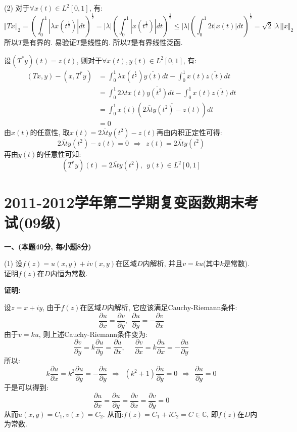 \documentclass{article}
\begin{document}
(2) 对于$\forall x(t) \in L^2[0,1]$, 有:
$$ \Vert Tx \Vert_2 = \left(\int_0^1 |\lambda x(t^{\frac{1}{2}})| dt \right)^{\frac{1}{2}} = |\lambda| \left( \int_0^1 |x(t^{\frac{1}{2}})| dt\right)^{\frac{1}{2}} \leq |\lambda| \left( \int_0^1 2t |x(t)| dt\right)^{\frac{1}{2}} = \sqrt{2} |\lambda| \Vert x \Vert_2 $$
所以$T$是有界的. 易验证$T$是线性的. 所以$T$是有界线性泛函.

 设$(T^*y)(t) = z(t)$, 则对于$\forall x(t), y(t) \in L^2[0,1]$, 有:
\begin{align*}
(Tx, y) - (x, T^*y) &= \int_0^1  \lambda x(t^{\frac{1}{2}})\overline{y(t)}dt - \int_0^1 x(t)\overline{z(t)}dt \\
          &= \int_0^1 2\lambda t x(t)\overline{y(t^2)}dt - \int_0^1 x(t)\overline{z(t)}dt \\
          &= \int_0^1 x(t)\left(\overline{2\overline{\lambda t} y(t^2)- z(t)}\right)dt \\
          &= 0
\end{align*}
由$x(t)$的任意性, 取$x(t) = 2\overline{\lambda t} y(t^2)- z(t)$再由内积正定性可得:
$$ 2\overline{\lambda t} y(t^2)- z(t) = 0 \ \ \Rightarrow \ \ z(t) = 2\overline{\lambda t} y(t^2) $$
再由$y(t)$的任意性可知:
$$ (T^*y)(t) =  2\overline{\lambda t} y(t^2), \ \ y(t) \in L^2[0,1] $$

\newpage

\section{2011-2012学年第二学期复变函数期末考试(09级)}

\textbf{一、(本题40分, 每小题8分)} 

(1) 设$f(z) = u(x,y) + iv(x,y)$在区域$D$内解析, 并且$v = ku$(其中$k$是常数). 证明$f(z)$在$D$内恒为常数. 

\textbf{证明:} 

设$z = x + iy$, 由于$f(z)$在区域$D$内解析, 它应该满足Cauchy-Riemann条件:
$$ \dfrac{\partial u}{\partial x} = \dfrac{\partial v}{\partial y}, \ \ \dfrac{\partial u}{\partial y} = -\dfrac{\partial v}{\partial x} $$
由于$v = ku$, 则上述Cauchy-Riemann条件变为:
$$ \dfrac{\partial v}{\partial y} = k\dfrac{\partial u}{\partial y} = \dfrac{\partial u}{\partial x}, \ \ \ \ \ \ \dfrac{\partial v}{\partial x} = k\dfrac{\partial u}{\partial x} = - \dfrac{\partial u}{\partial y}$$
所以:
$$ k\dfrac{\partial u}{\partial x} = k^2\dfrac{\partial u}{\partial y} = -\dfrac{\partial u}{\partial y} \ \ \Rightarrow  \ \ (k^2+1)\dfrac{\partial u}{\partial y} = 0  \ \ \Rightarrow \ \ \dfrac{\partial u}{\partial y} = 0 $$
于是可以得到: 
$$ \dfrac{\partial u}{\partial x} = \dfrac{\partial u}{\partial y} = \dfrac{\partial v}{\partial x} = \dfrac{\partial v}{\partial y} = 0 $$
从而$u(x, y) = C_1, v(x) = C_2$. 从而:$f(z) = C_1 + iC_2 = C \in \mathbb{C}$, 即$f(z)$在$D$内为常数. \\ \\
\end{document}
